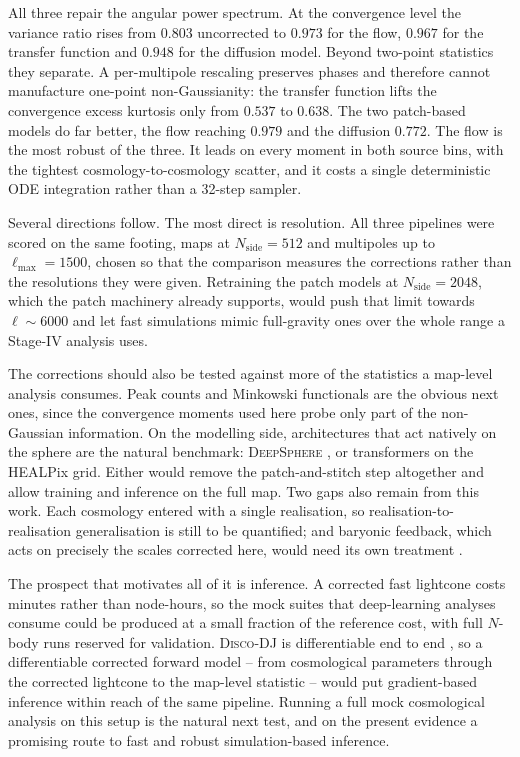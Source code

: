 \documentclass{report}
\begin{document}
All three repair the angular power spectrum. At the convergence level the variance ratio rises from \mbox{$0.803$} uncorrected to \mbox{$0.973$} for the flow, \mbox{$0.967$} for the transfer function and \mbox{$0.948$} for the diffusion model. Beyond two-point statistics they separate. A per-multipole rescaling preserves phases and therefore cannot manufacture one-point non-Gaussianity: the transfer function lifts the convergence excess kurtosis only from \mbox{$0.537$} to \mbox{$0.638$}. The two patch-based models do far better, the flow reaching \mbox{$0.979$} and the diffusion \mbox{$0.772$}. The flow is the most robust of the three. It leads on every moment in both source bins, with the tightest cosmology-to-cosmology scatter, and it costs a single deterministic ODE integration rather than a 32-step sampler.

Several directions follow. The most direct is resolution. All three pipelines were scored on the same footing, maps at \mbox{$N_{\mathrm{side}} = 512$} and multipoles up to \mbox{$\ell_{\max} = 1500$}, chosen so that the comparison measures the corrections rather than the resolutions they were given. Retraining the patch models at \mbox{$N_{\mathrm{side}} = 2048$}, which the patch machinery already supports, would push that limit towards \mbox{$\ell \sim 6000$} and let fast simulations mimic full-gravity ones over the whole range a Stage-IV analysis uses.

The corrections should also be tested against more of the statistics a map-level analysis consumes. Peak counts and Minkowski functionals are the obvious next ones, since the convergence moments used here probe only part of the non-Gaussian information. On the modelling side, architectures that act natively on the sphere are the natural benchmark: \textsc{DeepSphere} \cite{perraudin_deepsphere_2019, defferrard_deepsphere_2020}, or transformers on the HEALPix grid. Either would remove the patch-and-stitch step altogether and allow training and inference on the full map. Two gaps also remain from this work. Each cosmology entered with a single realisation, so realisation-to-realisation generalisation is still to be quantified; and baryonic feedback, which acts on precisely the scales corrected here, would need its own treatment \cite{schneider_matter_2015, fluri_full_2022}.

The prospect that motivates all of it is inference. A corrected fast lightcone costs minutes rather than node-hours, so the mock suites that deep-learning analyses consume \cite{thomsen_dark_2026, fluri_full_2022} could be produced at a small fraction of the reference cost, with full \mbox{$N$}-body runs reserved for validation. \textsc{Disco-DJ} is differentiable end to end \cite{list_disco-dj_2026}, so a differentiable corrected forward model -- from cosmological parameters through the corrected lightcone to the map-level statistic -- would put gradient-based inference within reach of the same pipeline. Running a full mock cosmological analysis on this setup is the natural next test, and on the present evidence a promising route to fast and robust simulation-based inference.
\end{document}
